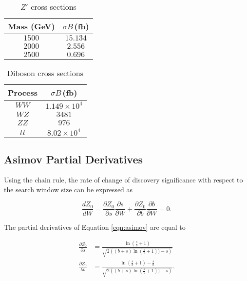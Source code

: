 \begin{table}[h!t]
\label{table:ZPrimeXS}
\centering
\caption{ $Z'$ cross sections }
\begin{tabular}{ |c|c| } 
\hline
Mass (GeV) & $\sigma B\,$(fb) \\\hline
$1500$ & $15.134$ \\\hline
$2000$ & $2.556$ \\\hline 
$2500$ & $0.696$ \\\hline
\end{tabular}
\end{table}

\begin{table}[h!t]
\label{table:DBi}
\centering
\caption{ Diboson cross sections }
\begin{tabular}{ |c|c| } 
\hline
Process & $\sigma B\,$(fb) \\\hline
$WW$ & $1.149\times10^4$ \\\hline
$WZ$ & $3481$ \\\hline 
$ZZ$ & $976$ \\\hline
$t\overline{t}$ & $8.02\times10^4$\\\hline
\end{tabular}
\end{table}

\subsection{Asimov Partial Derivatives}

Using the chain rule, the rate of change of discovery significance with respect to the search window size can be expressed as

\begin{equation}
\frac{d Z_0}{d W} = \frac{\partial Z_0}{\partial s}\frac{\partial s}{\partial W} + \frac{\partial Z_0}{\partial b}\frac{\partial b}{\partial W} = 0.
\end{equation}

The partial derivatives of Equation \ref{eqn:asimov} are equal to

\begin{equation}
\begin{split}
\frac{\partial Z_0}{\partial s} & = \frac{\ln(\frac{s}{b}+1)}{\sqrt{2\left((b+s)\ln(\frac{s}{b}+1))-s\right)}} \\ 
\frac{\partial Z_0}{\partial b} & = \frac{\ln(\frac{s}{b}+1)-\frac{s}{b}}{\sqrt{2\left((b+s)\ln(\frac{s}{b}+1))-s\right)}}.
\end{split}
\end{equation}

